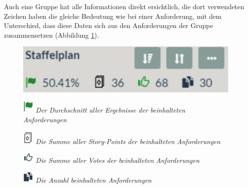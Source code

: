\pagebreak
Auch eine Gruppe hat alle Informationen direkt ersichtlich, die dort verwendeten Zeichen haben die gleiche Bedeutung wie bei einer Anforderung, mit dem Unterschied, dass diese Daten sich aus den Anforderungen der Gruppe zusammensetzen (Abbildung \ref{fig:gruppeninfo}).

\begin{figure}[!htb]
		\includegraphics[width=.5\textwidth]{images/groupinfo.pdf}
\centering 
{} 
\label{fig:gruppeninfo}
\end{figure}

\begin{figure}[!htb]
		\includegraphics[width=0.05\textwidth]{images/flag.pdf}
	\textit{Der Durchschnitt aller Ergebnisse der beinhalteten Anforderungen}
\end{figure}
\vspace{-15pt}
\begin{figure}[!htb]
		\includegraphics[width=0.05\textwidth]{images/cards.pdf}
	\textit{Die Summe aller Story-Points der beinhalteten Anforderungen}
\end{figure}
\vspace{-15pt}
\begin{figure}[!htb]
		\includegraphics[width=0.05\textwidth]{images/thumbs.pdf}
	\textit{Die Summe aller Votes der beinhalteten Anforderungen}
\end{figure}
\vspace{-15pt}
\begin{figure}[!htb]
		\includegraphics[width=0.05\textwidth]{images/files.pdf}
	\textit{Die Anzahl beinhalteten Anforderungen}
\end{figure}

